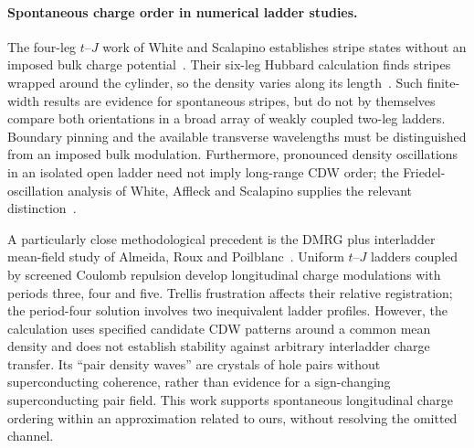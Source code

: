 \documentclass[11pt,letterpaper]{article}
\begin{document}
\paragraph{Spontaneous charge order in numerical ladder studies.}
The four-leg $t$--$J$ work of White and Scalapino establishes stripe states
without an imposed bulk charge potential~\citep{WhiteScalapino1997}.
Their six-leg Hubbard calculation finds stripes wrapped around the cylinder,
so the density varies along its length~\citep{WhiteScalapino2003}.
Such finite-width results are evidence for spontaneous stripes, but do not
by themselves compare both orientations in a broad array of weakly coupled
two-leg ladders. Boundary pinning and the available transverse wavelengths
must be distinguished from an imposed bulk modulation. Furthermore,
pronounced density oscillations in an isolated open ladder need not imply
long-range CDW order; the Friedel-oscillation analysis of
White, Affleck and Scalapino supplies the relevant
distinction~\citep{WhiteAffleckScalapino2002}.

A particularly close methodological precedent is the DMRG plus interladder
mean-field study of Almeida, Roux and Poilblanc~\citep{Almeida2010}.
Uniform $t$--$J$ ladders coupled by screened Coulomb repulsion develop
longitudinal charge modulations with periods three, four and five.
Trellis frustration affects their relative registration; the period-four
solution involves two inequivalent ladder profiles. However, the calculation
uses specified candidate CDW patterns around a common mean density and
does not establish stability against arbitrary interladder charge transfer.
Its ``pair density waves'' are crystals of hole pairs without superconducting
coherence, rather than evidence for a sign-changing superconducting pair field.
This work supports spontaneous longitudinal charge ordering within an
approximation related to ours, without resolving the omitted channel.
\end{document}
